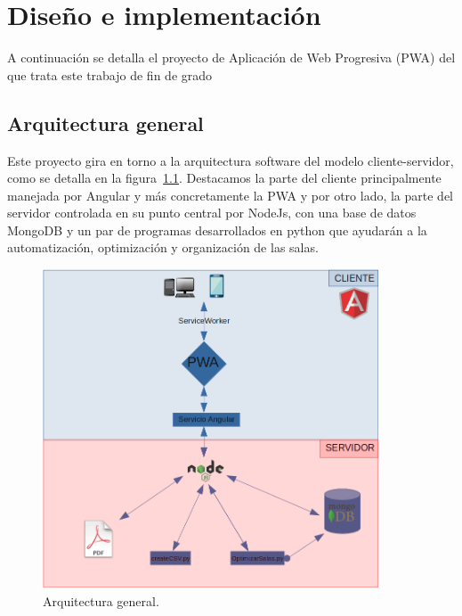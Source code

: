 \documentclass[a4paper, 12pt]{book}
\begin{document}

\cleardoublepage
\chapter{Diseño e implementación}

A continuación se detalla el proyecto de Aplicación de Web Progresiva (PWA) del que trata este trabajo de fin de grado

\section{Arquitectura general} 
\label{sec:arquitectura}

Este proyecto gira en torno a la arquitectura software del modelo cliente-servidor, como se detalla en la figura~\ref{fig:arquitectura}. Destacamos la parte del cliente principalmente manejada por Angular y más concretamente la PWA y por otro lado, la parte del servidor controlada en su punto central por NodeJs, con una base de datos MongoDB y un par de programas desarrollados en python que ayudarán a la automatización, optimización y organización de las salas.
\begin{figure}
  \centering
  \includegraphics[width=10cm, keepaspectratio]{img/arquitectura.png}
  \caption{Arquitectura general.}\label{fig:arquitectura}
\end{figure}
\end{document}
